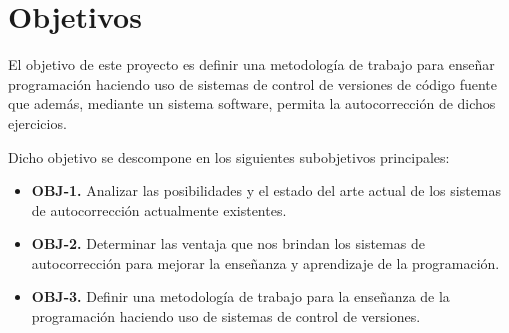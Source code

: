 \chapter{Objetivos}

El objetivo de este proyecto es definir una metodología de trabajo para enseñar programación haciendo uso de sistemas de control de versiones de código fuente que además, mediante un sistema software, permita la autocorrección de dichos ejercicios.







\bigskip
Dicho objetivo se descompone en los siguientes subobjetivos principales:

\begin{itemize}
  \item \textbf{OBJ-1.} Analizar las posibilidades y el estado del arte actual de los sistemas de autocorrección actualmente existentes.
  \item \textbf{OBJ-2.} Determinar las ventaja que nos brindan los sistemas de autocorrección para mejorar la enseñanza y aprendizaje de la programación.
  \item \textbf{OBJ-3.} Definir una metodología de trabajo para la enseñanza de la programación haciendo uso de sistemas de control de versiones.

\end{itemize}

